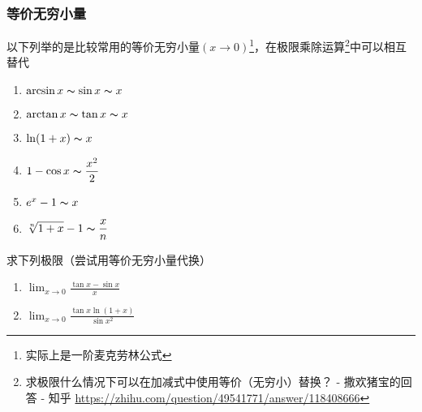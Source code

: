 \subsubsection{等价无穷小量}
\label{sec:sub:eq_equivalent_infinitesimal}
以下列举的是比较常用的等价无穷小量$(x\to 0)$\footnote{实际上是一阶麦克劳林公式}，在极限乘除运算\footnote{求极限什么情况下可以在加减式中使用等价（无穷小）替换？ - 撒欢猪宝的回答 - 知乎 \url{https://zhihu.com/question/49541771/answer/118408666}}中可以相互替代
\begin{enumerate}
	\itemsep -3pt
	\item $\arcsin x\thicksim\sin x\thicksim x$
	\item $\arctan x\thicksim\tan x\thicksim x$
	\item $\ln(1+x)\thicksim x$
	\item $\displaystyle 1-\cos x\thicksim\frac{x^2}{2}$
	\item $e^x-1\thicksim x$
	\item $\displaystyle \sqrt[n]{1+x}-1\thicksim\frac{x}{n}$
\end{enumerate}
\begin{exercise}
求下列极限（尝试用等价无穷小量代换）
\begin{enumerate}
	\item $\displaystyle\lim_{x\to 0}\frac{\tan x-\sin x}{x}$
	\item $\displaystyle\lim_{x\to 0}\frac{\tan x\ln(1+x)}{\sin x^2}$
\end{enumerate}
\end{exercise}

